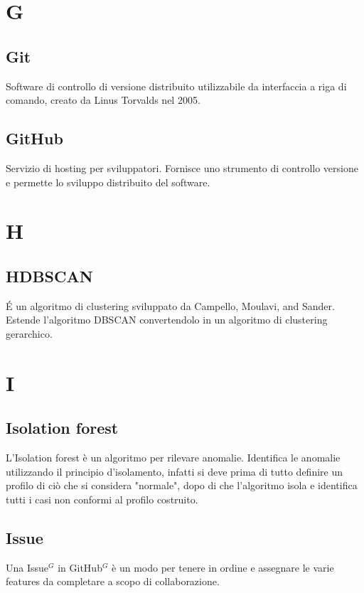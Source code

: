 \newpage
\section{G}
\subsection{Git}
Software di controllo di versione distribuito utilizzabile da interfaccia a riga di comando, creato da Linus Torvalds nel 2005.

\subsection{GitHub}
Servizio di hosting per sviluppatori. Fornisce uno strumento di controllo versione e permette lo sviluppo distribuito del software.

\newpage
\section{H}
\subsection{HDBSCAN}
\'E un algoritmo di clustering sviluppato da Campello, Moulavi, and Sander. Estende l'algoritmo DBSCAN convertendolo in un algoritmo di clustering gerarchico.

\newpage
\section{I}
\subsection{Isolation forest}
L'Isolation forest è un algoritmo per rilevare anomalie. Identifica le anomalie utilizzando il principio d'isolamento, infatti si deve prima di tutto definire un profilo di ciò che si considera "normale", dopo di che l'algoritmo isola e identifica tutti i casi non conformi al profilo costruito. 

\subsection{Issue}
Una Issue$^{G}$ in GitHub$^{G}$ è un modo per tenere in ordine e assegnare le varie features da completare a scopo di collaborazione.

